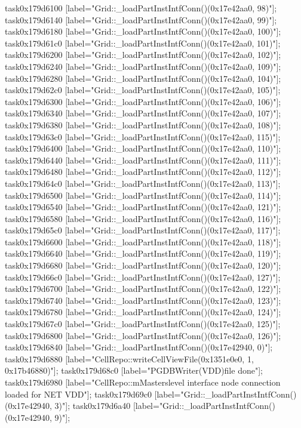 {	task0x179d6100 [label="Grid::_loadPartInstIntfConn()(0x17e42aa0, 98)"];
	task0x179d6140 [label="Grid::_loadPartInstIntfConn()(0x17e42aa0, 99)"];
	task0x179d6180 [label="Grid::_loadPartInstIntfConn()(0x17e42aa0, 100)"];
	task0x179d61c0 [label="Grid::_loadPartInstIntfConn()(0x17e42aa0, 101)"];
	task0x179d6200 [label="Grid::_loadPartInstIntfConn()(0x17e42aa0, 102)"];
	task0x179d6240 [label="Grid::_loadPartInstIntfConn()(0x17e42aa0, 109)"];
	task0x179d6280 [label="Grid::_loadPartInstIntfConn()(0x17e42aa0, 104)"];
	task0x179d62c0 [label="Grid::_loadPartInstIntfConn()(0x17e42aa0, 105)"];
	task0x179d6300 [label="Grid::_loadPartInstIntfConn()(0x17e42aa0, 106)"];
	task0x179d6340 [label="Grid::_loadPartInstIntfConn()(0x17e42aa0, 107)"];
	task0x179d6380 [label="Grid::_loadPartInstIntfConn()(0x17e42aa0, 108)"];
	task0x179d63c0 [label="Grid::_loadPartInstIntfConn()(0x17e42aa0, 115)"];
	task0x179d6400 [label="Grid::_loadPartInstIntfConn()(0x17e42aa0, 110)"];
	task0x179d6440 [label="Grid::_loadPartInstIntfConn()(0x17e42aa0, 111)"];
	task0x179d6480 [label="Grid::_loadPartInstIntfConn()(0x17e42aa0, 112)"];
	task0x179d64c0 [label="Grid::_loadPartInstIntfConn()(0x17e42aa0, 113)"];
	task0x179d6500 [label="Grid::_loadPartInstIntfConn()(0x17e42aa0, 114)"];
	task0x179d6540 [label="Grid::_loadPartInstIntfConn()(0x17e42aa0, 121)"];
	task0x179d6580 [label="Grid::_loadPartInstIntfConn()(0x17e42aa0, 116)"];
	task0x179d65c0 [label="Grid::_loadPartInstIntfConn()(0x17e42aa0, 117)"];
	task0x179d6600 [label="Grid::_loadPartInstIntfConn()(0x17e42aa0, 118)"];
	task0x179d6640 [label="Grid::_loadPartInstIntfConn()(0x17e42aa0, 119)"];
	task0x179d6680 [label="Grid::_loadPartInstIntfConn()(0x17e42aa0, 120)"];
	task0x179d66c0 [label="Grid::_loadPartInstIntfConn()(0x17e42aa0, 127)"];
	task0x179d6700 [label="Grid::_loadPartInstIntfConn()(0x17e42aa0, 122)"];
	task0x179d6740 [label="Grid::_loadPartInstIntfConn()(0x17e42aa0, 123)"];
	task0x179d6780 [label="Grid::_loadPartInstIntfConn()(0x17e42aa0, 124)"];
	task0x179d67c0 [label="Grid::_loadPartInstIntfConn()(0x17e42aa0, 125)"];
	task0x179d6800 [label="Grid::_loadPartInstIntfConn()(0x17e42aa0, 126)"];
	task0x179d6840 [label="Grid::_loadPartInstIntfConn()(0x17e42940, 0)"];
	task0x179d6880 [label="CellRepo::writeCellViewFile(0x1351e0e0, 1, 0x17b46880)"];
	task0x179d68c0 [label="PGDBWriter(VDD)\ncellviews file done"];
	task0x179d6980 [label="CellRepo::mMasters\nTop level interface node connection loaded for NET VDD"];
	task0x179d69c0 [label="Grid::_loadPartInstIntfConn()(0x17e42940, 3)"];
	task0x179d6a40 [label="Grid::_loadPartInstIntfConn()(0x17e42940, 9)"];
}
